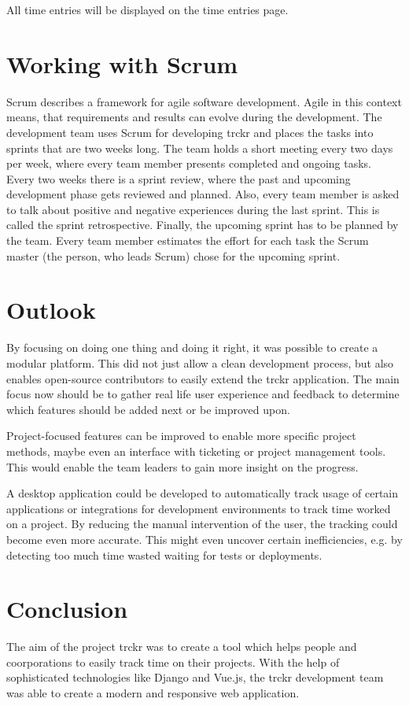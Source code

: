 \documentclass[bibliography=totoc, listof=totocnumbered]{scrartcl}
\begin{document}
All time entries will be displayed on the time entries page.

\section{Working with Scrum}
Scrum describes a framework for agile software development. Agile in this
context means, that requirements and results can evolve during the development.
The development team uses Scrum for developing trckr and places the tasks into
sprints that are two weeks long. The team holds a short meeting every two days
per week, where every team member presents completed and ongoing tasks. Every
two weeks there is a sprint review, where the past and upcoming development
phase gets reviewed and planned. Also, every team member is asked to talk about
positive and negative experiences during the last sprint. This is called the
sprint retrospective. Finally, the upcoming sprint has to be planned by the
team. Every team member estimates the effort for each task the Scrum master (the
person, who leads Scrum) chose for the upcoming sprint.

\section{Outlook}
By focusing on doing one thing and doing it right, it was possible to create a
modular platform. This did not just allow a clean development process, but also
enables open-source contributors to easily extend the trckr application. The
main focus now should be to gather real life user experience and feedback to
determine which features should be added next or be improved upon.

Project-focused features can be improved to enable more specific project
methods, maybe even an interface with ticketing or project management tools.
This would enable the team leaders to gain more insight on the progress.

A desktop application could be developed to automatically track usage of certain
applications or integrations for development environments to track time worked
on a project. By reducing the manual intervention of the user, the tracking
could become even more accurate. This might even uncover certain inefficiencies,
e.g. by detecting too much time wasted waiting for tests or deployments.

\section{Conclusion}
The aim of the project trckr was to create a tool which helps people and
coorporations to easily track time on their projects. With the help of
sophisticated technologies like Django and Vue.js, the trckr development
team was able to create a modern and responsive web application.
\end{document}
